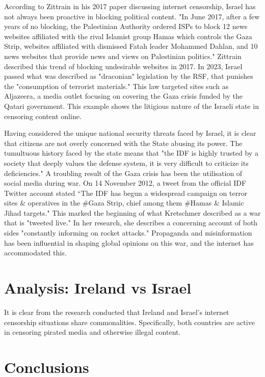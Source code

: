 According to Zittrain in his 2017 paper discussing internet censorship, Israel has not always been proactive in blocking political content. "In June 2017, after a few years of no blocking, the Palestinian Authority ordered ISPs to block 12 news websites affiliated with the rival Islamist group Hamas which controls the Gaza Strip, websites affiliated with dismissed Fatah leader Mohammed Dahlan, and 10 news websites that provide news and views on Palestinian politics." \cite{zittrain2017shifting} Zittrain described this trend of blocking undesirable websites in 2017. In 2023, Israel passed what was described as "draconian" legislation by the RSF, that punishes the "consumption of terrorist materials." \cite{RSF2024IsraelCensorship} This law targeted sites such as Aljazeera, a media outlet focusing on covering the Gaza crisis funded by the Qatari government. \cite{AlJazeera2023Knesset} This example shows the litigious nature of the Israeli state in censoring content online. 

Having considered the unique national security threats faced by Israel, it is clear that citizens are not overly concerned with the State abusing its power. The tumultuous history faced by the state means that "the IDF is highly trusted by a society that deeply values the defense system, it is very difficult to criticize its deficiencies." \cite{MAGEN2018287} A troubling result of the Gaza crisis has been the utilisation of social media during war. On 14 November 2012, a tweet from the official IDF Twitter account stated “The IDF has begun a widespread campaign on terror sites \& operatives in the
\#Gaza Strip, chief among them #Hamas \& Islamic Jihad targets." \cite{IDF_Twitter} This marked the beginning of what Kretschmer described as a war that is "tweeted live." In her research, she describes a concerning account of both sides "constantly informing on rocket attacks." \cite {Kretschmer_2017} Propaganda and misinformation has been influential in shaping global opinions on this war, and the internet has accommodated this.

\section{Analysis: Ireland vs Israel}
It is clear from the research conducted that Ireland and Israel's internet censorship situations share commonalities. Specifically, both countries are active in censoring pirated media and otherwise illegal content. 






\section{Conclusions}

